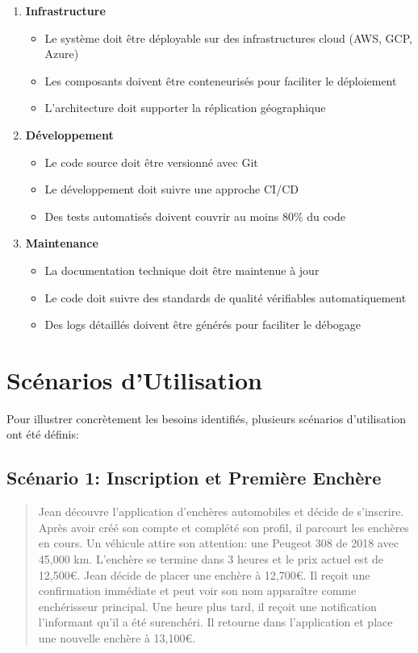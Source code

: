 \begin{enumerate}
    \item \textbf{Infrastructure}
    \begin{itemize}
        \item Le système doit être déployable sur des infrastructures cloud (AWS, GCP, Azure)
        \item Les composants doivent être conteneurisés pour faciliter le déploiement
        \item L'architecture doit supporter la réplication géographique
    \end{itemize}
    
    \item \textbf{Développement}
    \begin{itemize}
        \item Le code source doit être versionné avec Git
        \item Le développement doit suivre une approche CI/CD
        \item Des tests automatisés doivent couvrir au moins 80\% du code
    \end{itemize}
    
    \item \textbf{Maintenance}
    \begin{itemize}
        \item La documentation technique doit être maintenue à jour
        \item Le code doit suivre des standards de qualité vérifiables automatiquement
        \item Des logs détaillés doivent être générés pour faciliter le débogage
    \end{itemize}
\end{enumerate}

\section{Scénarios d'Utilisation}

Pour illustrer concrètement les besoins identifiés, plusieurs scénarios d'utilisation ont été définis:

\subsection{Scénario 1: Inscription et Première Enchère}

\begin{quote}
Jean découvre l'application d'enchères automobiles et décide de s'inscrire. Après avoir créé son compte et complété son profil, il parcourt les enchères en cours. Un véhicule attire son attention: une Peugeot 308 de 2018 avec 45,000 km. L'enchère se termine dans 3 heures et le prix actuel est de 12,500€. Jean décide de placer une enchère à 12,700€. Il reçoit une confirmation immédiate et peut voir son nom apparaître comme enchérisseur principal. Une heure plus tard, il reçoit une notification l'informant qu'il a été surenchéri. Il retourne dans l'application et place une nouvelle enchère à 13,100€.
\end{quote}

